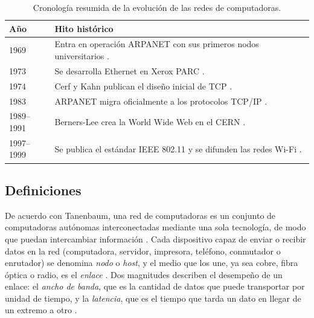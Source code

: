 \begin{table}[H]
    \centering
    \renewcommand{\arraystretch}{1.3}
    \begin{tabular}{|p{2.6cm}|p{12.2cm}|}
        \hline
        \textbf{Año} & \textbf{Hito histórico} \\ \hline
        1969 & Entra en operación ARPANET con sus primeros nodos universitarios \cite{tanenbaum:computer-networks:2021}. \\ \hline
        1973 & Se desarrolla Ethernet en Xerox PARC \cite{kurose:computer-networking:2017}. \\ \hline
        1974 & Cerf y Kahn publican el diseño inicial de TCP \cite{cerf:tcp:1974}. \\ \hline
        1983 & ARPANET migra oficialmente a los protocolos TCP/IP \cite{tanenbaum:computer-networks:2021}. \\ \hline
        1989--1991 & Berners-Lee crea la World Wide Web en el CERN \cite{forouzan:data-comm-networking:2013}. \\ \hline
        1997--1999 & Se publica el estándar IEEE 802.11 y se difunden las redes Wi-Fi \cite{tanenbaum:computer-networks:2021}. \\ \hline
    \end{tabular}
    \caption{Cronología resumida de la evolución de las redes de computadoras.}
    \label{tab:prac04:cronologia}
\end{table}

\subsection{Definiciones}
\label{sec:prac04:definiciones}

De acuerdo con Tanenbaum, una red de computadoras es un conjunto de computadoras autónomas interconectadas mediante una sola tecnología, de modo que puedan intercambiar información \cite{tanenbaum:computer-networks:2021}. Cada dispositivo capaz de enviar o recibir datos en la red (computadora, servidor, impresora, teléfono, conmutador o enrutador) se denomina \emph{nodo} o \emph{host}, y el medio que los une, ya sea cobre, fibra óptica o radio, es el \emph{enlace} \cite{stallings:data-computer-comm:2014}. Dos magnitudes describen el desempeño de un enlace: el \emph{ancho de banda}, que es la cantidad de datos que puede transportar por unidad de tiempo, y la \emph{latencia}, que es el tiempo que tarda un dato en llegar de un extremo a otro \cite{kurose:computer-networking:2017}.

